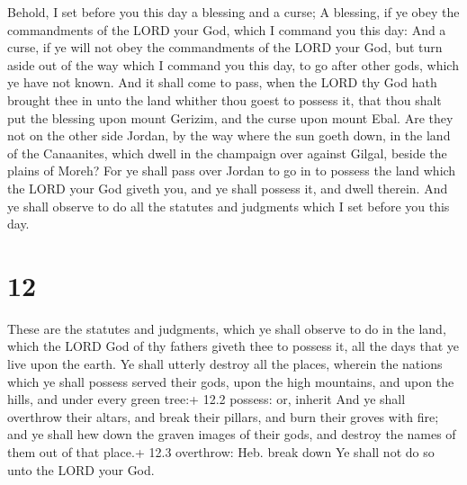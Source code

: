  Behold, I set before you this day a blessing and a
curse;  A blessing, if ye obey the commandments of the LORD
your God, which I command you this day:  And a curse, if ye
will not obey the commandments of the LORD your God, but turn aside out
of the way which I command you this day, to go after other gods, which
ye have not known.  And it shall come to pass, when the
LORD thy God hath brought thee in unto the land whither thou goest to
possess it, that thou shalt put the blessing upon mount Gerizim, and the
curse upon mount Ebal.  Are they not on the other side
Jordan, by the way where the sun goeth down, in the land of the
Canaanites, which dwell in the champaign over against Gilgal, beside the
plains of Moreh?  For ye shall pass over Jordan to go in to
possess the land which the LORD your God giveth you, and ye shall
possess it, and dwell therein.  And ye shall observe to do
all the statutes and judgments which I set before you this day.

\hypertarget{section-11}{%
\section{12}\label{section-11}}

 These are the statutes and judgments, which ye shall
observe to do in the land, which the LORD God of thy fathers giveth thee
to possess it, all the days that ye live upon the earth.  Ye
shall utterly destroy all the places, wherein the nations which ye shall
possess served their gods, upon the high mountains, and upon the hills,
and under every green tree:+ 12.2 possess: or, inherit  And
ye shall overthrow their altars, and break their pillars, and burn their
groves with fire; and ye shall hew down the graven images of their gods,
and destroy the names of them out of that place.+ 12.3 overthrow: Heb.
break down  Ye shall not do so unto the LORD your God.

